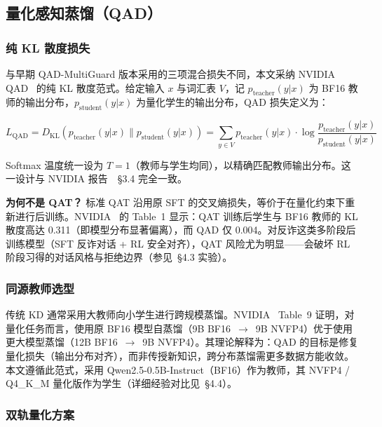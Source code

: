 \documentclass[UTF8,a4paper,10pt,twocolumn]{ctexart}
\theoremstyle{plain}
\newcommand{\QAD}{QAD-MultiGuard}
\begin{document}
\subsection{量化感知蒸馏（QAD）}

\subsubsection{纯 KL 散度损失}

与早期 \QAD{} 版本采用的三项混合损失不同，本文采纳 NVIDIA QAD~\cite{xin2026qad} 的纯 KL 散度范式。给定输入 $x$ 与词汇表 $V$，记 $p_{\mathrm{teacher}}(y|x)$ 为 BF16 教师的输出分布，$p_{\mathrm{student}}(y|x)$ 为量化学生的输出分布，QAD 损失定义为：

\begin{equation}\label{eq:kl}
L_{\mathrm{QAD}} = D_{\mathrm{KL}}( p_{\mathrm{teacher}}(y|x) \| p_{\mathrm{student}}(y|x) ) = \sum_{y \in V} p_{\mathrm{teacher}}(y|x) \cdot \log\frac{p_{\mathrm{teacher}}(y|x)}{p_{\mathrm{student}}(y|x)}
\end{equation}

Softmax 温度统一设为 $T = 1$（教师与学生均同），以精确匹配教师输出分布。这一设计与 NVIDIA 报告~\cite{xin2026qad}~\S3.4 完全一致。

\textbf{为何不是 QAT？} 标准 QAT 沿用原 SFT 的交叉熵损失，等价于在量化约束下重新进行后训练。NVIDIA~\cite{xin2026qad} 的 Table~1 显示：QAT 训练后学生与 BF16 教师的 KL 散度高达 0.311（即模型分布显著偏离），而 QAD 仅 0.004。对反诈这类多阶段后训练模型（SFT 反诈对话 + RL 安全对齐），QAT 风险尤为明显——会破坏 RL 阶段习得的对话风格与拒绝边界（参见~\S4.3 实验）。

\subsubsection{同源教师选型}

传统 KD 通常采用大教师向小学生进行跨规模蒸馏。NVIDIA~\cite{xin2026qad} Table~9 证明，对量化任务而言，使用原 BF16 模型自蒸馏（9B BF16~$\to$~9B NVFP4）优于使用更大模型蒸馏（12B BF16~$\to$~9B NVFP4）。其理论解释为：QAD 的目标是修复量化损失（输出分布对齐），而非传授新知识，跨分布蒸馏需更多数据方能收敛。本文遵循此范式，采用 Qwen2.5-0.5B-Instruct（BF16）作为教师，其 NVFP4 / Q4\_K\_M 量化版作为学生（详细经验对比见~\S4.4）。

\subsubsection{双轨量化方案}
\end{document}
